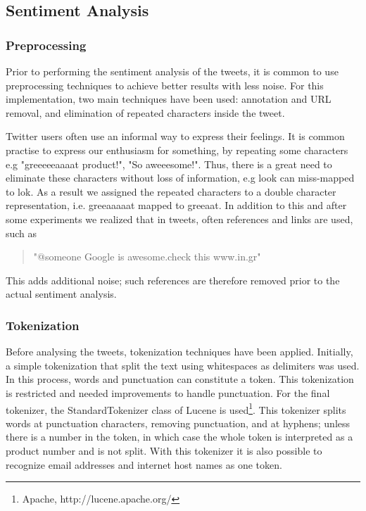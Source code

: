 \subsection{Sentiment Analysis}	%

\subsubsection{Preprocessing}       %

Prior to performing the sentiment analysis of the tweets, it is common to use preprocessing techniques to achieve better results with less noise. For this implementation, two main techniques have been used: annotation and URL removal,  and elimination of repeated characters inside the tweet. 

Twitter users often use an informal way to express their feelings. It is common practise to express our enthusiasm for something, by repeating some characters e.g "greeeeeaaaat product!", "So aweeesome!". Thus, there is a great need to eliminate these characters without loss of information, e.g look can miss-mapped to lok. As a result we assigned the repeated characters to a double character representation, i.e. greeaaaaat mapped to greeaat.
In addition to this and after some experiments we realized that in tweets, often references and links are used, such as 

\begin{quotation}
"@someone Google is awesome.check this www.in.gr" 
\end{quotation}
 
This adds additional noise; such references are therefore removed prior to the actual sentiment analysis.


\subsubsection{Tokenization}       %

Before analysing the tweets, tokenization techniques have been applied. Initially, a simple tokenization that split the text using whitespaces as delimiters was used. In this process, words and punctuation can constitute a token. 
This tokenization is restricted and needed improvements to handle punctuation. For the final tokenizer, the StandardTokenizer class of Lucene \cite{hatcher2004lucene} is used\footnote{Apache, http://lucene.apache.org/}. This tokenizer splits words at punctuation characters, removing punctuation, and at hyphens; unless there is a number in the token, in which case the whole token is interpreted as a product number and is not split. With this tokenizer it is also possible to recognize email addresses and internet host names as one token.


